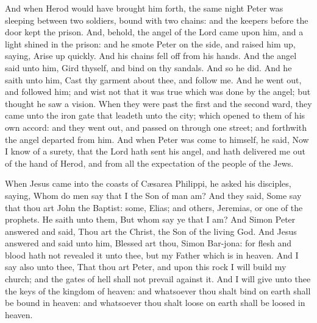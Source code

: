 And when Herod would have brought him forth, the same night Peter was sleeping between two soldiers, bound with two chains: and the keepers before the door kept the prison. And, behold, the angel of the Lord came upon him, and a light shined in the prison: and he smote Peter on the side, and raised him up, saying, Arise up quickly. And his chains fell off from his hands. And the angel said unto him, Gird thyself, and bind on thy sandals. And so he did. And he saith unto him, Cast thy garment about thee, and follow me. And he went out, and followed him; and wist not that it was true which was done by the angel; but thought he saw a vision. When they were past the first and the second ward, they came unto the iron gate that leadeth unto the city; which opened to them of his own accord: and they went out, and passed on through one street; and forthwith the angel departed from him. And when Peter was come to himself, he said, Now I know of a surety, that the Lord hath sent his angel, and hath delivered me out of the hand of Herod, and from all the expectation of the people of the Jews.


 When Jesus came into the coasts of C{\ae}sarea Philippi, he asked his disciples, saying, Whom do men say that I the Son of man am? And they said, Some say that thou art John the Baptist: some, Elias; and others, Jeremias, or one of the prophets. He saith unto them, But whom say ye that I am? And Simon Peter answered and said, Thou art the Christ, the Son of the living God. And Jesus answered and said unto him, Blessed art thou, Simon Bar-jona: for flesh and blood hath not revealed it unto thee, but my Father which is in heaven. And I say also unto thee, That thou art Peter, and upon this rock I will build my church; and the gates of hell shall not prevail against it. And I will give unto thee the keys of the kingdom of heaven: and whatsoever thou shalt bind on earth shall be bound in heaven: and whatsoever thou shalt loose on earth shall be loosed in heaven.


